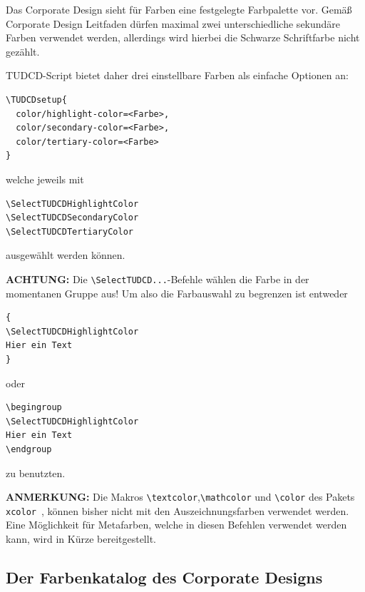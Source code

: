 \documentclass[
  logo={
    color=blue,
    language=de,
    colormodel=rgb
  },
  fontsize=11tudpt,
  usemargin,
  oneside
]{tudcdreprt}
\begin{document}
Das Corporate Design sieht für Farben eine festgelegte Farbpalette vor.
Gemäß Corporate Design Leitfaden dürfen maximal zwei unterschiedliche
sekundäre Farben verwendet werden, allerdings wird hierbei die Schwarze Schriftfarbe
nicht gezählt.

TUDCD-Script bietet daher drei einstellbare Farben als einfache Optionen an:
\begin{lstlisting}
\TUDCDsetup{
  color/highlight-color=<Farbe>,
  color/secondary-color=<Farbe>,
  color/tertiary-color=<Farbe>
}
\end{lstlisting}
welche jeweils mit
\begin{lstlisting}
\SelectTUDCDHighlightColor
\SelectTUDCDSecondaryColor
\SelectTUDCDTertiaryColor
\end{lstlisting}
ausgewählt werden können.

\textbf{ACHTUNG:} Die \lstinline|\SelectTUDCD...|-Befehle wählen die Farbe in der momentanen Gruppe aus!
Um also die Farbauswahl zu begrenzen ist entweder
\begin{lstlisting}
{
\SelectTUDCDHighlightColor
Hier ein Text
}
\end{lstlisting}
oder
\begin{lstlisting}
\begingroup
\SelectTUDCDHighlightColor
Hier ein Text
\endgroup
\end{lstlisting}
zu benutzten.

\textbf{ANMERKUNG:} Die Makros \lstinline|\textcolor|,\lstinline|\mathcolor| und \lstinline|\color| des Pakets \texttt{xcolor}~\cite{ctan-xcolor},
können bisher nicht mit den Auszeichnungsfarben verwendet werden. Eine Möglichkeit für Metafarben, welche in diesen Befehlen
verwendet werden kann, wird in Kürze bereitgestellt.

\subsection{Der Farbenkatalog des Corporate Designs}
\end{document}

